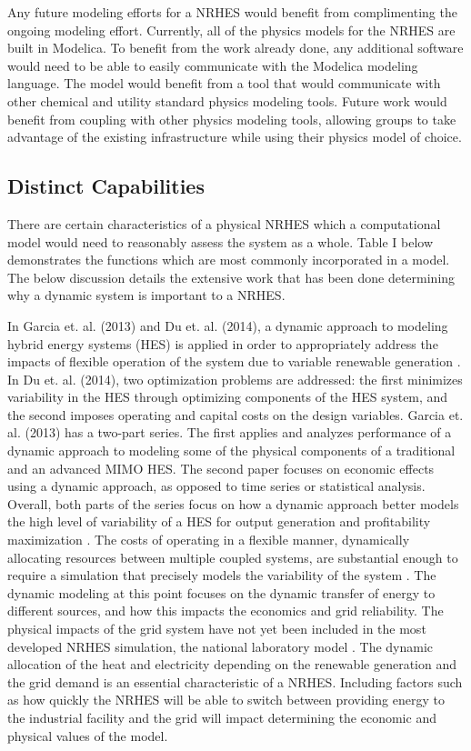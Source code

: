 Any future modeling efforts for a NRHES would benefit from complimenting the ongoing modeling effort. Currently, all of the physics models for the NRHES are built in Modelica. To benefit from the work already done, any additional software would need to be able to easily communicate with the Modelica modeling language.  The model would benefit from a tool that would communicate with other chemical and utility standard physics modeling tools. Future work would benefit from coupling with other physics modeling tools, allowing groups to take advantage of the existing infrastructure while using their physics model of choice.

\subsection{Distinct Capabilities}
There are certain characteristics of a physical NRHES which a computational model would need to reasonably assess the system as a whole. Table I below demonstrates the functions which are most commonly incorporated in a model. The below discussion details the extensive work that has been done determining why a dynamic system is important to a NRHES.

In Garcia et. al. (2013) and Du et. al. (2014), a dynamic approach to modeling hybrid energy systems (HES) is applied in order to appropriately address the impacts of flexible operation of the system due to variable renewable generation \cite{Garcia2013, Du2014}. In Du et. al. (2014), two optimization problems are addressed: the first minimizes variability in the HES through optimizing components of the HES system, and the second imposes operating and capital costs on the design variables. Garcia et. al. (2013) has a two-part series. The first applies and analyzes performance of a dynamic approach to modeling some of the physical components of a traditional and an advanced MIMO HES. The second paper focuses on economic effects using a dynamic approach, as opposed to time series or statistical analysis. Overall, both parts of the series focus on how a dynamic approach better models the high level of variability of a HES for output generation and profitability maximization \cite{Garcia2013}. The costs of operating in a flexible manner, dynamically allocating resources between multiple coupled systems, are substantial enough to require a simulation that precisely models the variability of the system \cite{Garcia2013, Shropshire2011, Locatelli2015}. The dynamic modeling at this point focuses on the dynamic transfer of energy to different sources, and how this impacts the economics and grid reliability. The physical impacts of the grid system have not yet been included in the most developed NRHES simulation, the national laboratory model \cite{Harrison2016}.  The dynamic allocation of the heat and electricity depending on the renewable generation and the grid demand is an essential characteristic of a NRHES.  Including factors such as how quickly the NRHES will be able to switch between providing energy to the industrial facility and the grid will impact determining the economic and physical values of the model.

